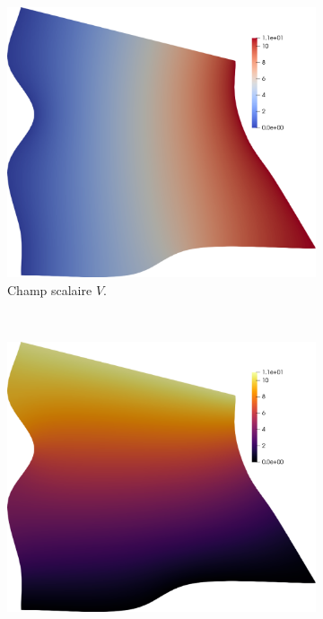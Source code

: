 \begin{figure}[h!]
\centering
\begin{subfigure}{0.455\textwidth}
    \includegraphics[width=\textwidth]{images/quad_equation_1.pdf}
    \caption{Champ scalaire $V$.}
    \label{fig:quad_equation_1}
\end{subfigure}
\\[0.2cm]
\begin{subfigure}{0.455\textwidth}
    \includegraphics[width=\textwidth]{images/quad_equation_2.pdf}

\end{subfigure}
\end{figure}
